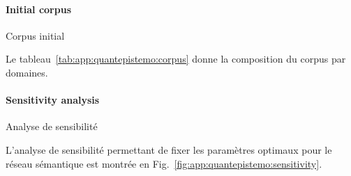 \paragraph{Initial corpus}{Corpus initial}

Le tableau~\ref{tab:app:quantepistemo:corpus} donne la composition du corpus par domaines.






\paragraph{Sensitivity analysis}{Analyse de sensibilité}

L'analyse de sensibilité permettant de fixer les paramètres optimaux pour le réseau sémantique est montrée en Fig.~\ref{fig:app:quantepistemo:sensitivity}.



